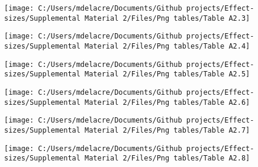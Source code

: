 \documentclass[
  english,
  man,mask]{apa6}
\begin{document}
\begin{sidewaysfigure}

{\centering \texttt{[image: C:/Users/mdelacre/Documents/Github projects/Effect-sizes/Supplemental Material 2/Files/Png tables/Table A2.3]} 

}

\end{sidewaysfigure}

\begin{sidewaysfigure}

{\centering \texttt{[image: C:/Users/mdelacre/Documents/Github projects/Effect-sizes/Supplemental Material 2/Files/Png tables/Table A2.4]} 

}

\end{sidewaysfigure}

\begin{sidewaysfigure}

{\centering \texttt{[image: C:/Users/mdelacre/Documents/Github projects/Effect-sizes/Supplemental Material 2/Files/Png tables/Table A2.5]} 

}

\end{sidewaysfigure}

\begin{sidewaysfigure}

{\centering \texttt{[image: C:/Users/mdelacre/Documents/Github projects/Effect-sizes/Supplemental Material 2/Files/Png tables/Table A2.6]} 

}

\end{sidewaysfigure}

\begin{sidewaysfigure}

{\centering \texttt{[image: C:/Users/mdelacre/Documents/Github projects/Effect-sizes/Supplemental Material 2/Files/Png tables/Table A2.7]} 

}

\end{sidewaysfigure}

\begin{sidewaysfigure}

{\centering \texttt{[image: C:/Users/mdelacre/Documents/Github projects/Effect-sizes/Supplemental Material 2/Files/Png tables/Table A2.8]} 

}

\end{sidewaysfigure}
\end{document}
